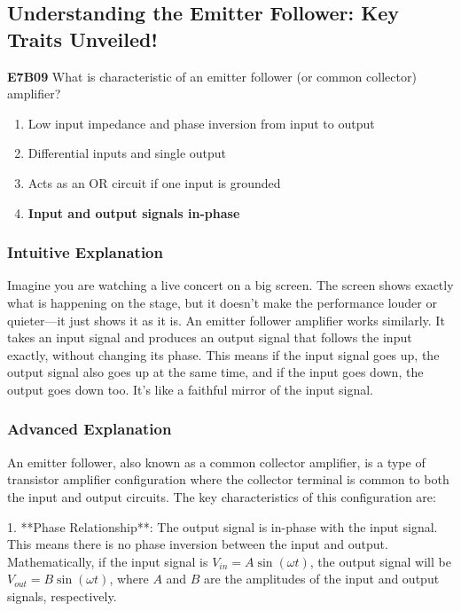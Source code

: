 \subsection{Understanding the Emitter Follower: Key Traits Unveiled!}

\begin{tcolorbox}[colback=gray!10!white,colframe=black!75!black,title=E7B09]
\textbf{E7B09} What is characteristic of an emitter follower (or common collector) amplifier?
\begin{enumerate}[label=\Alph*)]
    \item Low input impedance and phase inversion from input to output
    \item Differential inputs and single output
    \item Acts as an OR circuit if one input is grounded
    \item \textbf{Input and output signals in-phase}
\end{enumerate}
\end{tcolorbox}

\subsubsection{Intuitive Explanation}
Imagine you are watching a live concert on a big screen. The screen shows exactly what is happening on the stage, but it doesn’t make the performance louder or quieter—it just shows it as it is. An emitter follower amplifier works similarly. It takes an input signal and produces an output signal that follows the input exactly, without changing its phase. This means if the input signal goes up, the output signal also goes up at the same time, and if the input goes down, the output goes down too. It’s like a faithful mirror of the input signal.

\subsubsection{Advanced Explanation}
An emitter follower, also known as a common collector amplifier, is a type of transistor amplifier configuration where the collector terminal is common to both the input and output circuits. The key characteristics of this configuration are:

1. **Phase Relationship**: The output signal is in-phase with the input signal. This means there is no phase inversion between the input and output. Mathematically, if the input signal is \( V_{in} = A \sin(\omega t) \), the output signal will be \( V_{out} = B \sin(\omega t) \), where \( A \) and \( B \) are the amplitudes of the input and output signals, respectively.

